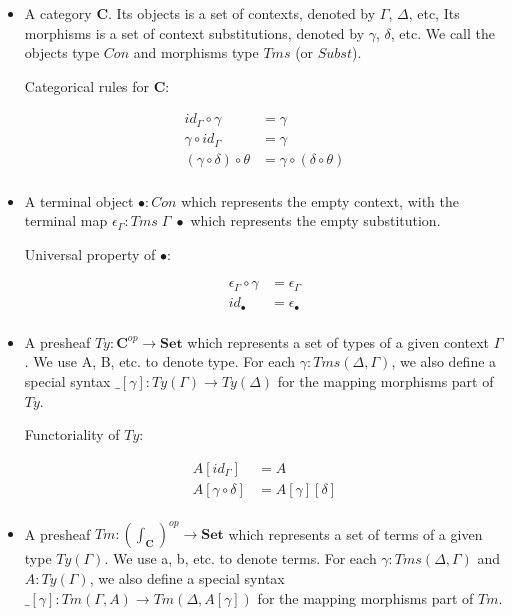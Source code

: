 \begin{itemize}
  \item{A category \textbf{C}. Its objects is a set of contexts, denoted by $\Gamma$, $\Delta$, etc, Its morphisms is a set of context substitutions, denoted by $\gamma$, $\delta$, etc. We call the objects type $Con$ and morphisms type $Tms$ (or $Subst$).
  
  Categorical rules for \textbf{C}:

  \begin{align*}
    id_{\Gamma} \circ \gamma & = \gamma \\
    \gamma \circ id_{\Gamma} & = \gamma \\
    (\gamma \circ \delta) \circ \theta & = \gamma \circ (\delta \circ \theta) \\
  \end{align*}
  }

  \item{A terminal object $\bullet : Con$ which represents the empty context, with the terminal map $\epsilon_{\Gamma} : Tms\;\Gamma\;\bullet$ which represents the empty substitution. 
  
  Universal property of $\bullet$:

  \begin{align*}
    \epsilon_{\Gamma} \circ \gamma & = \epsilon_{\Gamma} \\
    id_{\bullet} & = \epsilon_{\bullet} \\
  \end{align*}
  }

  \item{A presheaf $Ty : \textbf{C}^{op} \to \textbf{Set}$ which represents a set of types of a given context $\Gamma$. We use A, B, etc. to denote type. For each $\gamma : Tms (\Delta, \Gamma)$, we also define a special syntax $\_[\gamma] : Ty(\Gamma) \to Ty(\Delta)$ for the mapping morphisms part of $Ty$.

  Functoriality of $Ty$:

  \begin{align*}
    A [id_{\Gamma}] & = A \\
    A [\gamma \circ \delta] & = A [\gamma] [\delta] \\
  \end{align*}
  }

  \item{A presheaf 
  $Tm : (\int_{\textbf{C}})^{op} \to \textbf{Set}$ 
  which represents a set of terms of a given type $Ty(\Gamma)$. We use a, b, etc. to denote terms. For each $\gamma : Tms (\Delta, \Gamma)$ and $A : Ty(\Gamma)$, we also define a special syntax $\_[\gamma] : Tm(\Gamma, A) \to Tm(\Delta, A [\gamma])$ for the mapping morphisms part of $Tm$.

}
\end{itemize}
